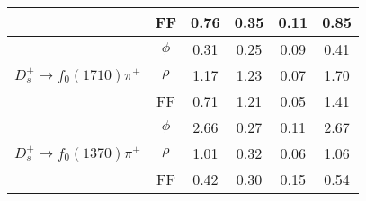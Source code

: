 {\begin{table}[tp]
\begin{tabular}{cccccc}
                                                                                        & FF            & 0.76      &0.35       &0.11   &0.85  \\
            \hline
            \multirow{3}{*}{$D_{s}^{+} \rightarrow f_{0}(1710)\pi^{+}$}                 & $\phi$        & 0.31      &0.25       &0.09   &0.41  \\
                                                                                        & $\rho$        & 1.17      &1.23       &0.07   &1.70  \\
                                                                                        & FF            & 0.71      &1.21       &0.05   &1.41  \\
            \hline
            \multirow{3}{*}{$D_{s}^{+} \rightarrow f_{0}(1370)\pi^{+}$}                 & $\phi$        & 2.66      &0.27       &0.11   &2.67   \\
                                                                                        & $\rho$        & 1.01      &0.32       &0.06   &1.06  \\
                                                                                        & FF            & 0.42      &0.30       &0.15   &0.54  \\
            \bottomrule\bottomrule
        \end{tabular}  
    \end{table}  

}
